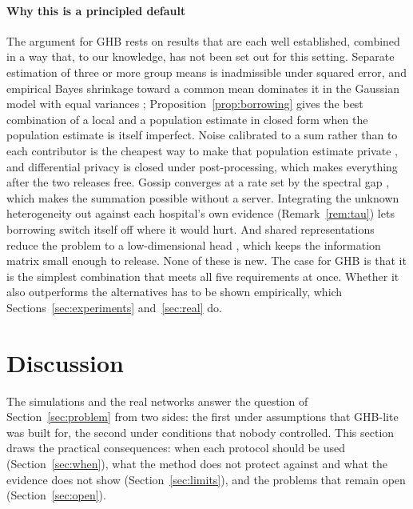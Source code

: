 \documentclass[acmsmall,screen,review]{acmart}
\theoremstyle{acmdefinition}
\begin{document}
\paragraph{Why this is a principled default} The argument for GHB rests on results that are each well established, combined in a way that, to our knowledge, has not been set out for this setting. Separate estimation of three or more group means is inadmissible under squared error, and empirical Bayes shrinkage toward a common mean dominates it in the Gaussian model with equal variances \cite{efron1973steins,stein1956inadmissibility}; Proposition~\ref{prop:borrowing} gives the best combination of a local and a population estimate in closed form when the population estimate is itself imperfect. Noise calibrated to a sum rather than to each contributor is the cheapest way to make that population estimate private \cite{bonawitz2017practical,dwork2014algorithmic}, and differential privacy is closed under post-processing, which makes everything after the two releases free. Gossip converges at a rate set by the spectral gap \cite{boyd2006randomized,xiao2004fast}, which makes the summation possible without a server. Integrating the unknown heterogeneity out against each hospital's own evidence (Remark~\ref{rem:tau}) lets borrowing switch itself off where it would hurt. And shared representations reduce the problem to a low-dimensional head \cite{maurer2016benefit,tripuraneni2020theory}, which keeps the information matrix small enough to release. None of these is new. The case for GHB is that it is the simplest combination that meets all five requirements at once. Whether it also outperforms the alternatives has to be shown empirically, which Sections~\ref{sec:experiments} and~\ref{sec:real} do.





\section{Discussion}\label{sec:discussion}

The simulations and the real networks answer the question of Section~\ref{sec:problem} from two sides: the first under assumptions that GHB-lite was built for, the second under conditions that nobody controlled. This section draws the practical consequences: when each protocol should be used (Section~\ref{sec:when}), what the method does not protect against and what the evidence does not show (Section~\ref{sec:limits}), and the problems that remain open (Section~\ref{sec:open}).
\end{document}
